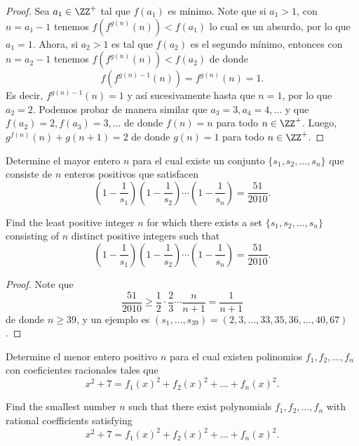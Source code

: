 \begin{proof}
  Sea $a_1\in\ZZ^+$ tal que $f(a_1)$ es mínimo. Note que si $a_1>1$, con
  $n=a_1-1$ tenemos $f(f^{g(n)}(n))<f(a_1)$ lo cual es un absurdo, por lo que
  $a_1=1$. Ahora, si $a_2>1$ es tal que $f(a_2)$ es el segundo mínimo, entonces
  con $n=a_2-1$ tenemos $f(f^{g(n)}(n))<f(a_2)$ de donde
  \[f(f^{g(n)-1}(n))=f^{g(n)}(n)=1.\]
  Es decir, $f^{g(n)-1}(n)=1$ y así sucesivamente hasta que $n=1$, por lo que
  $a_2=2$. Podemos probar de manera similar que $a_3=3,a_4=4,\dots$ y que
  $f(a_2)=2,f(a_3)=3,\dots$ de donde $f(n)=n$ para todo $n\in\ZZ^+$. Luego,
  $g^{f(n)}(n)+g(n+1)=2$ de donde $g(n)=1$ para todo $n\in\ZZ^+$.
\end{proof}


\begin{probEG}[ISL 2010/N2]
  Determine el mayor entero $n$ para el cual existe un conjunto
  $\{s_1,s_2,\dots,s_n\}$ que consiste de $n$ enteros positivos que satisfacen
  \[
    \left(1-\frac{1}{s_1}\right)\left(1-\frac{1}{s_2}\right)\cdots\left(1-\frac{1}{s_n}\right)
    =\frac{51}{2010}.
  \]
  \begin{hint}
    Find the least positive integer $n$ for which there exists a set
    $\{s_1,s_2,\dots,s_n\}$ consisting of $n$ distinct positive integers such
    that
    \[
      \left(1-\frac{1}{s_1}\right)\left(1-\frac{1}{s_2}\right)\cdots\left(1-\frac{1}{s_n}\right)
      =\frac{51}{2010}.
    \]
  \end{hint}
\end{probEG}

\begin{proof}
  Note que
  \[\frac{51}{2010}\ge\frac12\cdot\frac23\cdots\frac{n}{n+1}=\frac{1}{n+1}\]
  de donde $n\ge 39$, y un ejemplo es
  $(s_1,\dots,s_{39})=(2,3,\dots,33,35,36,\dots,40,67)$.
\end{proof}

\begin{probEB}[ISL 2010/N3]
  Determine el menor entero positivo $n$ para el cual existen polinomios
  $f_1,f_2,\dots,f_n$ con coeficientes racionales tales que
  \[x^2+7=f_1(x)^2+f_2(x)^2+\dots+f_n(x)^2.\]
  \begin{hint}
    Find the smallest number $n$ such that there exist polynomials
    $f_1,f_2,\dots,f_n$ with rational coefficients satisfying
    \[x^2+7=f_1(x)^2+f_2(x)^2+\dots+f_n(x)^2.\]
  \end{hint}
\end{probEB}

